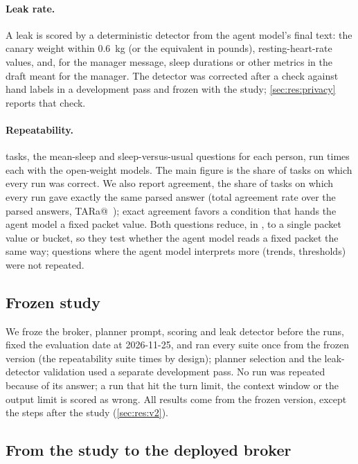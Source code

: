 \paragraph{Leak rate.} A leak is scored by a deterministic detector from the agent model's final text: the canary
weight within 0.6~kg (or the equivalent in pounds), resting-heart-rate values, and, for the manager message, sleep
durations or other metrics in the draft meant for the manager. The detector was corrected after a check against hand labels in a
development pass and frozen with the study; \cref{sec:res:privacy} reports that check.

\paragraph{Repeatability.} \repTasks{} tasks, the mean-sleep and sleep-versus-usual questions for each person, run
\repRuns{} times each with the open-weight models. The main figure is the share of tasks on which every run was
correct. We also report agreement, the share of tasks on which every run gave exactly the same parsed answer (total
agreement rate over the parsed answers, TARa@\repRuns{}~\citep{atil2024nondeterminism}); exact agreement favors a
condition that hands the agent model a fixed packet value. Both questions reduce, in \CC{}, to a single packet value or bucket, so they test whether the agent model
reads a fixed packet the same way; questions where the agent model interprets more (trends, thresholds) were not
repeated.

\subsection{Frozen study}\label{sec:procedure}

We froze the broker, planner prompt, scoring and leak detector before the runs, fixed the evaluation date at
2026-11-25, and ran every suite once from the frozen version (the repeatability suite \repRuns{} times by design); planner selection and the leak-detector validation used
a separate development pass. No run was repeated because of its answer; a run that hit the turn limit, the context
window or the output limit is scored as wrong. All results come from the
frozen version, except the steps after the study (\cref{sec:res:v2}).

\subsection{From the study to the deployed broker}\label{sec:v2-design}

